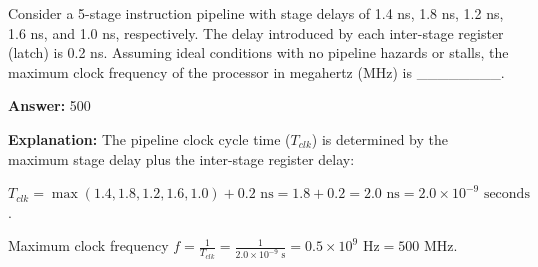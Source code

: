 \begin{tcolorbox}[enhanced,breakable,colback=boxgray,colframe=gray!45,boxrule=0.4pt,arc=2pt,left=6pt,right=6pt,top=4pt,bottom=4pt,title={Q.30},fonttitle=\bfseries\small,coltitle=black,colbacktitle=gray!15]
\small Consider a 5-stage instruction pipeline with stage delays of 1.4 ns, 1.8 ns, 1.2 ns, 1.6 ns, and 1.0 ns, respectively. The delay introduced by each inter-stage register (latch) is 0.2 ns. Assuming ideal conditions with no pipeline hazards or stalls, the maximum clock frequency of the processor in megahertz (MHz) is \_\_\_\_\_\_\_\_.\par\par{}\par\smallskip\textbf{Answer:} 500\par\par\textbf{Explanation:} The pipeline clock cycle time ($T_{clk}$) is determined by the maximum stage delay plus the inter-stage register delay:\par
$T_{clk} = \max(1.4, 1.8, 1.2, 1.6, 1.0) + 0.2\text{ ns} = 1.8 + 0.2 = 2.0\text{ ns} = 2.0 \times 10^{-9}\text{ seconds}$.\par
Maximum clock frequency $f = \frac{1}{T_{clk}} = \frac{1}{2.0 \times 10^{-9}\text{ s}} = 0.5 \times 10^9\text{ Hz} = 500\text{ MHz}$.\par
\end{tcolorbox}


